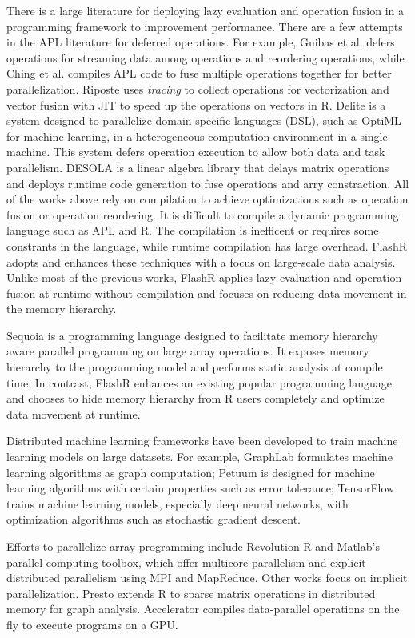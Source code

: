 There is a large literature for deploying lazy evaluation and operation fusion
in a programming framework to improvement performance. There are a few attempts
in the APL literature for deferred operations. For example, Guibas et al.
\cite{Guibas78} defers operations for streaming data among operations and
reordering operations, while Ching et al. \cite{Ching12} compiles APL code
to fuse multiple operations together for better parallelization.
Riposte \cite{riposte} uses
\textit{tracing} to collect operations for vectorization and vector fusion
with JIT to speed up the operations on vectors in R.
Delite \cite{delite} is a system designed to parallelize domain-specific languages
(DSL), such as OptiML \cite{optiml} for machine learning, in a heterogeneous
computation environment in a single machine. This system
defers operation execution to allow both data and task parallelism.
DESOLA \cite{desola} is a linear algebra library that delays matrix operations
and deploys runtime code generation to fuse operations and arry constraction.
All of the works above rely on compilation to achieve optimizations such as
operation fusion or operation reordering.
It is difficult to compile a dynamic programming language such as APL and R.
The compilation is inefficent or requires some constrants in the language,
while runtime compilation has large overhead.
FlashR adopts and enhances these techniques with a focus on large-scale
data analysis. Unlike most of the previous works, FlashR applies lazy evaluation
and operation fusion at runtime without compilation and focuses on reducing
data movement in the memory hierarchy.

Sequoia \cite{sequoia} is a programming language designed to facilitate
memory hierarchy aware parallel programming on large array operations.
It exposes memory hierarchy to the programming model and performs static
analysis at compile time. In contrast, FlashR enhances an existing popular
programming language and chooses to hide memory
hierarchy from R users completely and optimize data movement at runtime.

Distributed machine learning frameworks have been developed to train machine
learning models on large datasets. For example, GraphLab \cite{graphlab}
formulates machine learning algorithms as graph computation; Petuum \cite{petuum}
is designed for machine learning algorithms with certain properties such as
error tolerance; TensorFlow \cite{tensorflow} trains machine learning models,
especially deep neural networks, with optimization algorithms such as
stochastic gradient descent.

Efforts to parallelize array programming include Revolution R \cite{rro} and
Matlab's parallel computing toolbox, which offer multicore parallelism and
explicit distributed parallelism using MPI and MapReduce. Other works focus
on implicit parallelization. Presto \cite{presto} extends R to sparse matrix
operations in distributed memory for graph analysis. Accelerator
\cite{accelerator} compiles
data-parallel operations on the fly to execute programs on a GPU.
